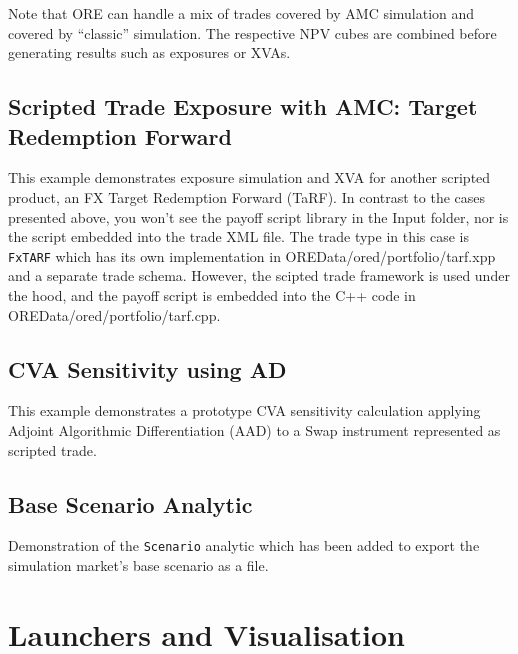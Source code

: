 \documentclass[12pt, a4paper]{article}
\begin{document}
Note that ORE can handle a mix of trades covered by AMC simulation and covered by ``classic'' simulation.
The respective NPV cubes are combined before generating results such as exposures or XVAs.

\subsection{Scripted Trade Exposure with AMC: Target Redemption Forward}%
\label{example:55}

This example demonstrates exposure simulation and XVA for another scripted product, an
FX Target Redemption Forward (TaRF). In contrast to the cases presented above, you won't see
the payoff script library in the Input folder, nor is the script embedded into the trade XML file.
The trade type in this case is {\tt FxTARF} which has its own implementation in OREData/ored/portfolio/tarf.xpp
and a separate trade schema. However, the scipted trade framework is used under the hood, and the payoff
script is embedded into the C++ code in OREData/ored/portfolio/tarf.cpp.

\subsection{CVA Sensitivity using AD}%
\label{example:56}

This example demonstrates a prototype CVA sensitivity calculation applying Adjoint Algorithmic Differentiation (AAD)
to a Swap instrument represented as scripted trade. 

\subsection{Base Scenario Analytic}%
\label{example:57}

Demonstration of the {\tt Scenario} analytic which has been added to export the simulation market's base scenario
as a file.

\clearpage
\section{Launchers and Visualisation}\label{sec:visualisation}
\end{document}
